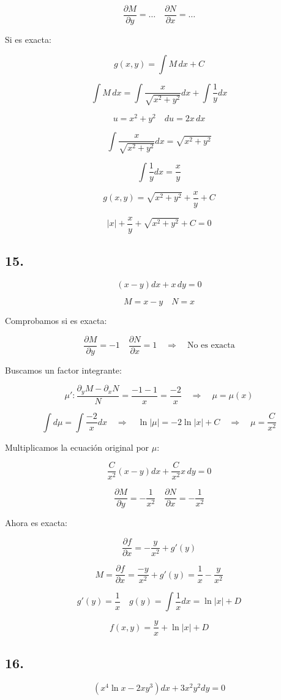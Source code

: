 \documentclass[a4paper,12pt]{article}
\begin{document}
\[
\frac{\partial M}{\partial y} = \dots \quad \frac{\partial N}{\partial x} = \dots
\]

Si es exacta:

\[
g(x,y) = \int M\, dx + C
\]

\[
\int M\, dx = \int \frac{x}{\sqrt{x^2 + y^2}} dx + \int \frac{1}{y} dx
\]

\[
u = x^2 + y^2 \quad du = 2x\, dx
\]

\[
\int \frac{x}{\sqrt{x^2 + y^2}} dx = \sqrt{x^2 + y^2}
\]

\[
\int \frac{1}{y} dx = \frac{x}{y}
\]

\[
g(x,y) = \sqrt{x^2 + y^2} + \frac{x}{y} + C
\]

\[
|x| + \frac{x}{y} + \sqrt{x^2 + y^2} + C = 0
\]
\subsection*{15.}
\[
(x - y)dx + x\, dy = 0
\]

\[
M = x - y \quad N = x
\]

Comprobamos si es exacta:

\[
\frac{\partial M}{\partial y} = -1 \quad \frac{\partial N}{\partial x} = 1 \quad \Rightarrow \quad \text{No es exacta}
\]

Buscamos un factor integrante:

\[
\mu': \frac{\partial_y M - \partial_x N}{N} = \frac{-1 - 1}{x} = \frac{-2}{x} \quad \Rightarrow \quad \mu = \mu(x)
\]

\[
\int d\mu = \int \frac{-2}{x} dx \quad \Rightarrow \quad \ln|\mu| = -2 \ln|x| + C \quad \Rightarrow \quad \mu = \frac{C}{x^2}
\]

Multiplicamos la ecuación original por $\mu$:

\[
\frac{C}{x^2}(x - y) dx + \frac{C}{x^2} x\, dy = 0
\]

\[
\frac{\partial M}{\partial y} = -\frac{1}{x^2} \quad \frac{\partial N}{\partial x} = -\frac{1}{x^2}
\]

Ahora es exacta:

\[
\frac{\partial f}{\partial x} = -\frac{y}{x^2} + g'(y)
\]

\[
M = \frac{\partial f}{\partial x} = \frac{-y}{x^2} + g'(y) = \frac{1}{x} - \frac{y}{x^2}
\]

\[
g'(y) = \frac{1}{x} \quad g(y) = \int \frac{1}{x} dx = \ln|x| + D
\]

\[
f(x,y) = \frac{y}{x} + \ln|x| + D
\]


\subsection*{16.}
\[
(x^4 \ln x - 2x y^3) dx + 3x^2 y^2 dy = 0
\]
\end{document}
